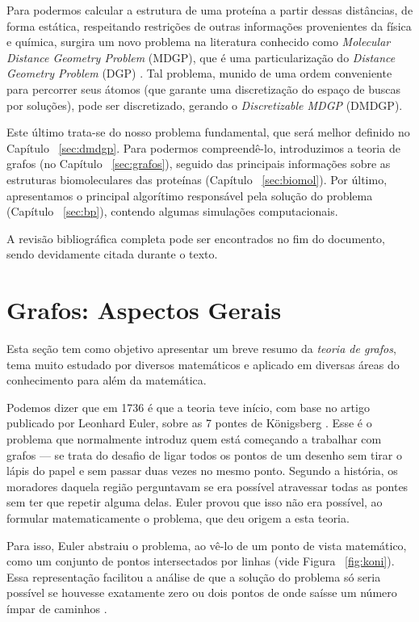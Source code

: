 \documentclass[a4paper,12pt]{article}
\begin{document}
	Para podermos calcular a estrutura de uma proteína a partir dessas distâncias, de forma estática, respeitando restrições de outras informações provenientes da física e química, surgira um novo problema na literatura conhecido como \textit{Molecular Distance Geometry Problem} (MDGP), que é uma particularização do \textit{Distance Geometry Problem} (DGP) \cite{carlileGDandAplications}. Tal problema, munido de uma ordem conveniente para percorrer seus átomos (que garante uma discretização do espaço de buscas por soluções), pode ser discretizado, gerando o \textit{Discretizable MDGP} (DMDGP).
	
	Este último trata-se do nosso problema fundamental, que será melhor definido no Capítulo ~\ref{sec:dmdgp}. Para podermos compreendê-lo, introduzimos a teoria de grafos (no Capítulo ~\ref{sec:grafos}), seguido das principais informações sobre as estruturas biomoleculares das proteínas (Capítulo ~\ref{sec:biomol}). Por último, apresentamos o principal algorítimo responsável pela solução do problema (Capítulo ~\ref{sec:bp}), contendo algumas simulações computacionais.
	
	A revisão bibliográfica completa pode ser encontrados no fim do documento, sendo devidamente citada durante o texto. 
	
	\newpage
	
	\section{Grafos: Aspectos Gerais\label{sec:grafos}}
	Esta seção tem como objetivo apresentar um breve resumo da \textit{teoria de grafos}, tema muito estudado por diversos matemáticos e aplicado em diversas áreas do conhecimento para além da matemática.
	
	 Podemos dizer que em 1736 é que a teoria teve início, com base no artigo publicado por Leonhard Euler, sobre as 7 pontes de Königsberg \cite{euler:KOENIGSBERG} \cite{grafos1}. Esse é o problema que normalmente introduz quem está começando a trabalhar com grafos --- se trata do desafio de ligar todos os pontos de um desenho sem tirar o lápis do papel e sem passar duas vezes no mesmo ponto. Segundo a história, os moradores daquela região perguntavam se era possível atravessar todas as pontes sem ter que repetir alguma delas. Euler provou que isso não era possível, ao formular matematicamente o problema, que deu origem a esta teoria.
	
	Para isso, Euler abstraiu o problema, ao vê-lo de um ponto de vista matemático, como um conjunto de pontos intersectados por linhas (vide Figura ~\ref{fig:koni}). Essa representação facilitou a análise de que a solução do problema só seria possível se houvesse exatamente zero ou dois pontos de onde saísse um número ímpar de caminhos \cite{euler:KOENIGSBERG}.
	
\end{document}
